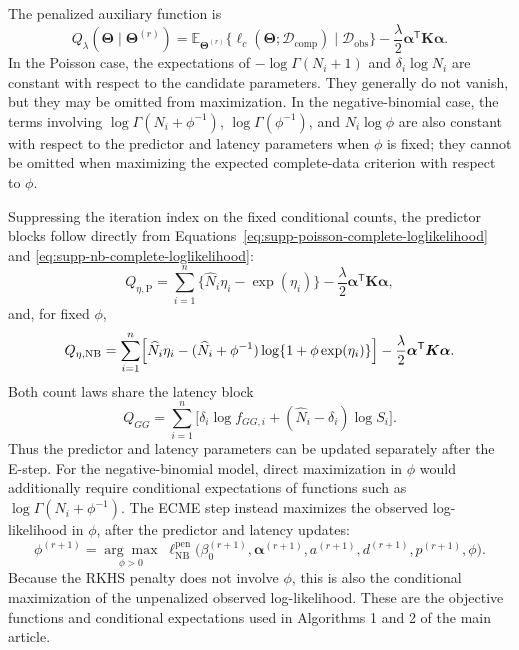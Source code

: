 \documentclass[11pt]{article}
\begin{document}
The penalized auxiliary function is
\begin{equation}
Q_\lambda(\bm\Theta\mid\bm\Theta^{(r)})
=\mathbb E_{\bm\Theta^{(r)}}
\{\ell_c(\bm\Theta;\mathcal D_{\mathrm{comp}})
\mid\mathcal D_{\mathrm{obs}}\}
-\frac{\lambda}{2}\bm\alpha^{\mathsf T}\bm K\bm\alpha.
\label{eq:supp-penalized-Q}
\end{equation}
In the Poisson case, the expectations of $-\log\Gamma(N_i+1)$ and $\delta_i\log N_i$ are constant with respect to the candidate parameters. They generally do not vanish, but they may be omitted from maximization. In the negative-binomial case, the terms involving $\log\Gamma(N_i+\phi^{-1})$, $\log\Gamma(\phi^{-1})$, and $N_i\log\phi$ are also constant with respect to the predictor and latency parameters when $\phi$ is fixed; they cannot be omitted when maximizing the expected complete-data criterion with respect to $\phi$.

Suppressing the iteration index on the fixed conditional counts, the predictor blocks follow directly from Equations~\eqref{eq:supp-poisson-complete-loglikelihood} and \eqref{eq:supp-nb-complete-loglikelihood}:
\begin{equation}
Q_{\eta,\mathrm P}
=\sum_{i=1}^{n}\{\widehat N_i\eta_i-\exp(\eta_i)\}
-\frac{\lambda}{2}\bm\alpha^{\mathsf T}\bm K\bm\alpha,
\label{eq:supp-poisson-predictor}
\end{equation}
and, for fixed $\phi$,
\begin{equation}
Q_{\eta,\mathrm{NB}}
=\sum_{i=1}^{n}\Bigl[
\widehat N_i\eta_i-(\widehat N_i+\phi^{-1})
\log\{1+\phi\exp(\eta_i)\}
\Bigr]
-\frac{\lambda}{2}\bm\alpha^{\mathsf T}\bm K\bm\alpha.
\label{eq:supp-nb-predictor}
\end{equation}
Both count laws share the latency block
\begin{equation}
Q_{GG}
=\sum_{i=1}^{n}\bigl[
\delta_i\log f_{GG,i}+(\widehat N_i-\delta_i)\log S_i
\bigr].
\label{eq:supp-latency-block}
\end{equation}
Thus the predictor and latency parameters can be updated separately after the E-step. For the negative-binomial model, direct maximization in $\phi$ would additionally require conditional expectations of functions such as $\log\Gamma(N_i+\phi^{-1})$. The ECME step instead maximizes the observed log-likelihood in $\phi$, after the predictor and latency updates:
\begin{equation}
\phi^{(r+1)}
=\underset{\phi>0}{\arg\max}\;
\ell_{\mathrm{NB}}^{\mathrm{pen}}
\bigl(\beta_0^{(r+1)},\bm\alpha^{(r+1)},
a^{(r+1)},d^{(r+1)},p^{(r+1)},\phi\bigr).
\label{eq:supp-ecme-dispersion}
\end{equation}
Because the RKHS penalty does not involve $\phi$, this is also the conditional maximization of the unpenalized observed log-likelihood. These are the objective functions and conditional expectations used in Algorithms 1 and 2 of the main article.
\end{document}
